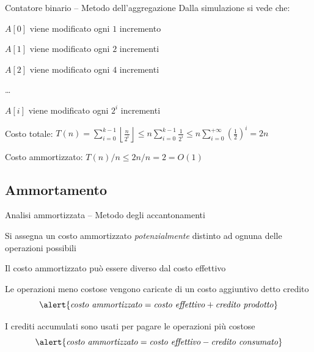\begin{frame}{Contatore binario -- Metodo dell'aggregazione}	
Dalla simulazione si vede che:
\BI
\item $A[0]$ viene modificato ogni $1$ incremento
\item $A[1]$ viene modificato ogni $2$ incrementi
\item $A[2]$ viene modificato ogni $4$ incrementi
\item \ldots
\item $A[i]$ viene modificato ogni $2^i$ incrementi
\EI
\begin{myboxtitle}
\BIL
\item \alert{Costo totale}:
$\displaystyle
T(n) = \sum_{i=0}^{k-1} \left\lfloor \frac{n}{2^i} \right\rfloor \leq n \sum_{i=0}^{k-1}  \frac{1}{2^i} \leq n \sum_{i=0}^{+\infty}  \left(\frac{1}{2}\right)^i = 2n
$
\item \alert{Costo ammortizzato}: $T(n)/n \leq 2n/n = 2  = O(1)$
\EIL
\end{myboxtitle}
\end{frame}

\subsection{Ammortamento}

\begin{frame}{Analisi ammortizzata -- Metodo degli accantonamenti}
\BI
\item Si assegna un costo ammortizzato \emph{potenzialmente} distinto ad ognuna delle operazioni possibili
\item Il costo ammortizzato può essere diverso dal costo effettivo
\BI
\item Le operazioni meno costose vengono caricate di un costo aggiuntivo detto \alert{credito}
\[
\alert{\mathit{costo\ ammortizzato} = \mathit{costo\ effettivo} + \mathit{credito\ prodotto}}
\]
\item I crediti accumulati sono usati per pagare le operazioni più costose
\[
\alert{\mathit{costo\ ammortizzato} = \mathit{costo\ effettivo} - \mathit{credito\ consumato}}
\]
\EI
\EI
\end{frame}


